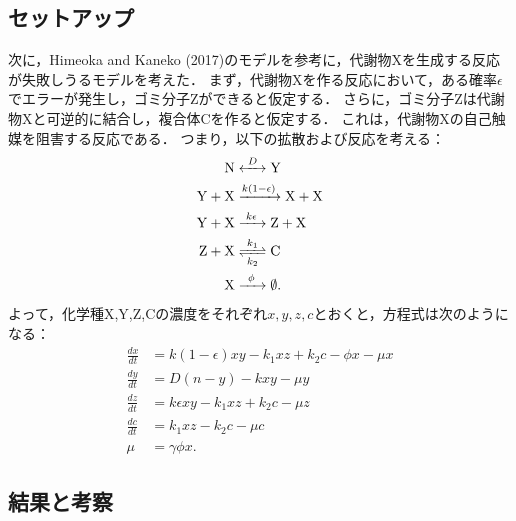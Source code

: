 \subsection{セットアップ}
次に，Himeoka and Kaneko (2017)のモデル\cite{hk17}を参考に，代謝物Xを生成する反応が失敗しうるモデルを考えた．
まず，代謝物Xを作る反応において，ある確率$\epsilon$でエラーが発生し，ゴミ分子Zができると仮定する．
さらに，ゴミ分子Zは代謝物Xと可逆的に結合し，複合体Cを作ると仮定する．
これは，代謝物Xの自己触媒を阻害する反応である．
つまり，以下の拡散および反応を考える：
\begin{align}
  \ce{N &<->[$D$] Y} \\
  \ce{Y + X &->[$k(1-\epsilon)$] X + X} \\
  \ce{Y + X &->[$k\epsilon$] Z + X} \\
  \ce{Z + X &<=>[$k_1$][$k_2$] C} \\
  \ce{X &->[\phi] \emptyset}.
\end{align}
よって，化学種X,Y,Z,Cの濃度をそれぞれ$x,y,z,c$とおくと，方程式は次のようになる：
\begin{align}
  \frac{dx}{dt} &= k(1-\epsilon)xy - k_1 xz + k_2 c - \phi x - \mu x\\
  \frac{dy}{dt} &= D(n-y) - kxy - \mu y \\
  \frac{dz}{dt} &= k\epsilon xy - k_1 xz + k_2 c - \mu z \\
  \frac{dc}{dt} &= k_1 xz - k_2 c - \mu c \\ 
  \mu &= \gamma \phi x.
\end{align}

\subsection{結果と考察}





